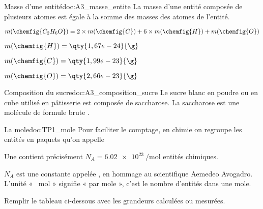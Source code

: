 \begin{doc}{Masse d'une entité}{doc:A3_masse_entite}
  La masse d'une entité composée de plusieurs atomes est égale à la somme des masses des atomes de l'entité.
  
  \exemple 
  $m(\chemfig{C_2 H_6 O}) = 2\times m(\chemfig{C}) + 6\times m(\chemfig{H}) + m(\chemfig{O})$
  
  \begin{donnees}
    \item $m(\chemfig{H})  = \qty{1,67e-24}{\g}$
    \item $m(\chemfig{C})  = \qty{1,99e-23}{\g}$
    \item $m(\chemfig{O})  = \qty{2,66e-23}{\g}$
  \end{donnees}
\end{doc}

\begin{doc}{Composition du sucre}{doc:A3_composition_sucre}
  Le sucre blanc en poudre ou en cube utilisé en pâtisserie est composée de saccharose.
  La saccharose est une molécule de formule brute .
\end{doc}




\begin{doc}{La mole}{doc:TP1_mole}
  Pour faciliter le comptage, en chimie on regroupe les entités en paquets qu'on appelle 
  \begin{encart}
    Une  contient précisément $N_A = \qty{6,02 e23}{\per\mole}$ entités chimiques.
  \end{encart}
  \attention $N_A$ est une constante appelée , en hommage au scientifique Aemedeo Avogadro.
  L'unité « \unit{\per\mole} » signifie « par mole », c’est le nombre d'entités dans une mole.
\end{doc}


\mesure Remplir le tableau ci-dessous avec les grandeurs calculées ou mesurées.

